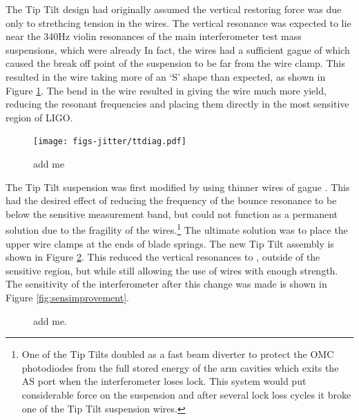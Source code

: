 The Tip Tilt design had originally assumed the vertical restoring force was due only to strethcing tension in the wires. %
The vertical resonance was expected to lie near the 340Hz violin resonances of the main interferometer test mass suspensions, which were already In fact, the wires had a sufficient gague of  which caused the break off point of the suspension to be far from the wire clamp. %
This resulted in the wire taking more of an `S' shape than expected, as shown in Figure \ref{fig:ttdiag}. %
The bend in the wire resulted in giving the wire much more yield, reducing the resonant frequencies and placing them directly in the most sensitive region of LIGO. %

\begin{figure}
  \begin{center}
  \leavevmode
  \texttt{[image: figs-jitter/ttdiag.pdf]}
  \end{center}
  \caption[add me]{add me}
  \label{fig:ttdiag}
\end{figure}

The Tip Tilt suspension was first modified by using thinner wires of gague . %
This had the desired effect of reducing the frequency of the bounce resonance to be below the sensitive measurement band, but could not function as a permanent solution due to the fragility of the wires.\footnote{One of the Tip Tilts doubled as a fast beam diverter to protect the OMC photodiodes from the full stored energy of the arm cavities which exits the AS port when the interferometer loses lock. %
This system would put considerable force on the suspension and after several lock loss cycles it broke one of the Tip Tilt suspension wires.} The ultimate solution was to place the upper wire clamps at the ends of blade springs. %
The new Tip Tilt assembly is shown in Figure \ref{fig:bladephoto}. %
This reduced the vertical resonances to , outside of the sensitive region, but while still allowing the use of wires with enough strength. %
The sensitivity of the interferometer after this change was made is shown in Figure \ref{fig:sensimprovement}.

\begin{figure}
  \begin{center}
  \leavevmode
  \end{center}
  \caption[add me]{add me.}
  \label{fig:bladephoto}
\end{figure}

